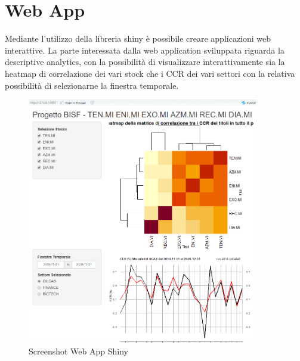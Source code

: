 \documentclass[12pt]{article}
\begin{document}
\section{Web App}
Mediante l'utilizzo della libreria shiny è possibile creare applicazioni web interattive. La parte interessata dalla web application sviluppata riguarda la descriptive analytics, con la possibilità di visualizzare interattivamente sia la heatmap di correlazione dei vari stock che i CCR dei vari settori con la relativa possibilità di selezionarne la finestra temporale.
\begin{figure}[!htb]
    \centering
    \includegraphics[width=0.9\textwidth]{immagini/WEBAPP.png}
    \caption{Screenshot Web App Shiny}
\end{figure}
\FloatBarrier
\newpage
\end{document}
